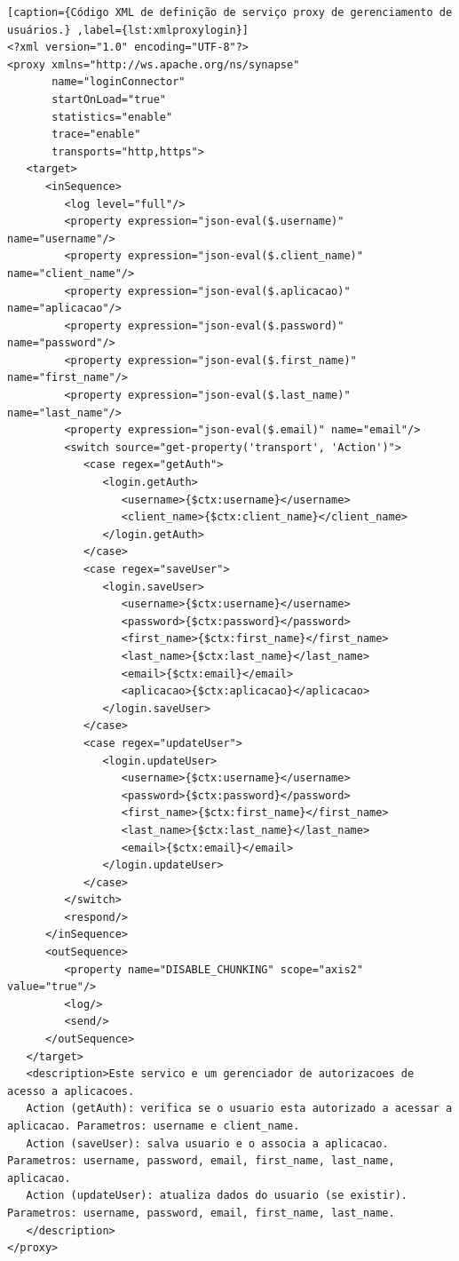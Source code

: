 \begin{lstlisting}[caption={Código XML de definição de serviço proxy de gerenciamento de usuários.} ,label={lst:xmlproxylogin}]
<?xml version="1.0" encoding="UTF-8"?>
<proxy xmlns="http://ws.apache.org/ns/synapse"
       name="loginConnector"
       startOnLoad="true"
       statistics="enable"
       trace="enable"
       transports="http,https">
   <target>
      <inSequence>
         <log level="full"/>
         <property expression="json-eval($.username)" name="username"/>
         <property expression="json-eval($.client_name)" name="client_name"/>
         <property expression="json-eval($.aplicacao)" name="aplicacao"/>
         <property expression="json-eval($.password)" name="password"/>
         <property expression="json-eval($.first_name)" name="first_name"/>
         <property expression="json-eval($.last_name)" name="last_name"/>
         <property expression="json-eval($.email)" name="email"/>
         <switch source="get-property('transport', 'Action')">
            <case regex="getAuth">
               <login.getAuth>
                  <username>{$ctx:username}</username>
                  <client_name>{$ctx:client_name}</client_name>
               </login.getAuth>
            </case>
            <case regex="saveUser">
               <login.saveUser>
                  <username>{$ctx:username}</username>
                  <password>{$ctx:password}</password>
                  <first_name>{$ctx:first_name}</first_name>
                  <last_name>{$ctx:last_name}</last_name>
                  <email>{$ctx:email}</email>
                  <aplicacao>{$ctx:aplicacao}</aplicacao>
               </login.saveUser>
            </case>
            <case regex="updateUser">
               <login.updateUser>
                  <username>{$ctx:username}</username>
                  <password>{$ctx:password}</password>
                  <first_name>{$ctx:first_name}</first_name>
                  <last_name>{$ctx:last_name}</last_name>
                  <email>{$ctx:email}</email>
               </login.updateUser>
            </case>
         </switch>
         <respond/>
      </inSequence>
      <outSequence>
         <property name="DISABLE_CHUNKING" scope="axis2" value="true"/>
         <log/>
         <send/>
      </outSequence>
   </target>
   <description>Este servico e um gerenciador de autorizacoes de acesso a aplicacoes.
   Action (getAuth): verifica se o usuario esta autorizado a acessar a aplicacao. Parametros: username e client_name.
   Action (saveUser): salva usuario e o associa a aplicacao. Parametros: username, password, email, first_name, last_name, aplicacao.
   Action (updateUser): atualiza dados do usuario (se existir). Parametros: username, password, email, first_name, last_name.
   </description>
</proxy>
\end{lstlisting}

